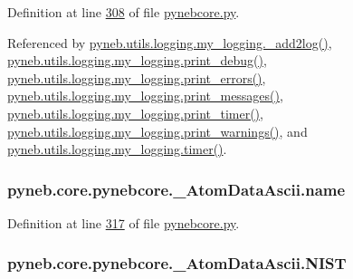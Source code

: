 Definition at line \hyperlink{pynebcore_8py_source_l00308}{308} of file \hyperlink{pynebcore_8py_source}{pynebcore.\-py}.



Referenced by \hyperlink{logging_8py_source_l00059}{pyneb.\-utils.\-logging.\-my\-\_\-logging.\-\_\-add2log()}, \hyperlink{logging_8py_source_l00157}{pyneb.\-utils.\-logging.\-my\-\_\-logging.\-print\-\_\-debug()}, \hyperlink{logging_8py_source_l00149}{pyneb.\-utils.\-logging.\-my\-\_\-logging.\-print\-\_\-errors()}, \hyperlink{logging_8py_source_l00133}{pyneb.\-utils.\-logging.\-my\-\_\-logging.\-print\-\_\-messages()}, \hyperlink{logging_8py_source_l00165}{pyneb.\-utils.\-logging.\-my\-\_\-logging.\-print\-\_\-timer()}, \hyperlink{logging_8py_source_l00141}{pyneb.\-utils.\-logging.\-my\-\_\-logging.\-print\-\_\-warnings()}, and \hyperlink{logging_8py_source_l00115}{pyneb.\-utils.\-logging.\-my\-\_\-logging.\-timer()}.

\hypertarget{classpyneb_1_1core_1_1pynebcore_1_1___atom_data_ascii_ab03fcf558862acb02a57ccd5accf155d}{
\subsubsection[{name}]{\setlength{\rightskip}{0pt plus 5cm}pyneb.\-core.\-pynebcore.\-\_\-\-Atom\-Data\-Ascii.\-name}}\label{classpyneb_1_1core_1_1pynebcore_1_1___atom_data_ascii_ab03fcf558862acb02a57ccd5accf155d}


Definition at line \hyperlink{pynebcore_8py_source_l00317}{317} of file \hyperlink{pynebcore_8py_source}{pynebcore.\-py}.

\hypertarget{classpyneb_1_1core_1_1pynebcore_1_1___atom_data_ascii_a95b245a32e3666f6313e40a6ea8e627c}{
\subsubsection[{N\-I\-S\-T}]{\setlength{\rightskip}{0pt plus 5cm}pyneb.\-core.\-pynebcore.\-\_\-\-Atom\-Data\-Ascii.\-N\-I\-S\-T}}\label{classpyneb_1_1core_1_1pynebcore_1_1___atom_data_ascii_a95b245a32e3666f6313e40a6ea8e627c}



